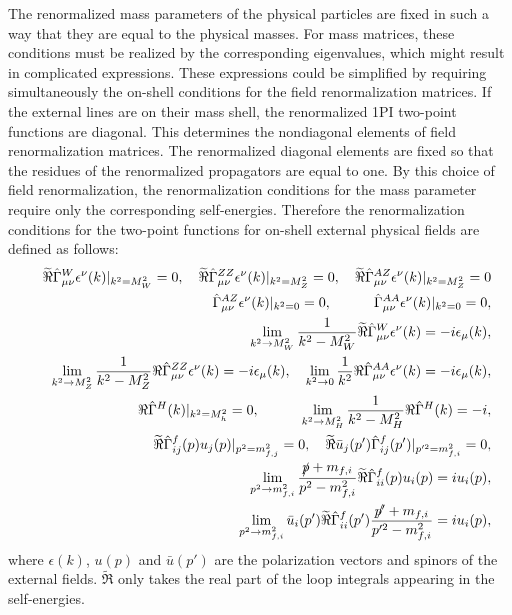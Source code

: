 The renormalized mass parameters of the physical particles are fixed in such a way that they are equal to the physical masses. For mass matrices, these conditions must be realized by the corresponding eigenvalues, which might result in complicated expressions. These expressions could be simplified by requiring simultaneously the on-shell conditions for the field renormalization matrices. If the external lines are on their mass shell, the renormalized 1PI two-point functions are diagonal. This determines the nondiagonal elements of field renormalization matrices. The renormalized diagonal elements are fixed so that the residues of the renormalized propagators are equal to one. By this choice of field renormalization, the renormalization conditions for the mass parameter require only the corresponding self-energies. Therefore the renormalization conditions for the two-point functions for on-shell external physical fields are defined as follows:
\begin{eqnarray}
&&\widetilde{\Re}\hat{\Gamma}^W_{\mu\nu}\epsilon^\nu(k)|_{k^2=M^2_W}=0,\quad \widetilde{\Re}\hat{\Gamma}^{ZZ}_{\mu\nu}\epsilon^\nu(k)|_{k^2=M^2_Z}=0,\quad \widetilde{\Re}\hat{\Gamma}^{AZ}_{\mu\nu}\epsilon^\nu(k)|_{k^2=M^2_Z}=0\nonumber\\
&&\hat{\Gamma}^{AZ}_{\mu\nu}\epsilon^\nu(k)|_{k^2=0}=0, \quad\qquad \hat{\Gamma}^{AA}_{\mu\nu}\epsilon^\nu(k)|_{k^2=0}=0,\nonumber\\
&&\lim_{k^2\to M_W^2}\frac{1}{k^2-M_W^2}\widetilde{\Re}\hat{\Gamma}^W_{\mu\nu}\epsilon^\nu(k)=-i\epsilon_\mu(k),\nonumber\\
&&\lim_{k^2\to M_Z^2}\frac{1}{k^2-M_Z^2}\Re\hat{\Gamma}^{ZZ}_{\mu\nu}\epsilon^\nu(k)=-i\epsilon_\mu(k), \quad \lim_{k^2\to 0}\frac{1}{k^2}\Re\hat{\Gamma}^{AA}_{\mu\nu}\epsilon^\nu(k)=-i\epsilon_\mu(k),\nonumber\\
&&\Re\hat{\Gamma}^H(k)|_{k^2=M_h^2}=0,\quad\qquad \lim_{k^2\to M_H^2}\frac{1}{k^2-M_H^2}\Re\hat{\Gamma}^H(k)=-i,\nonumber\\
&&\widetilde{\Re}\hat{\Gamma}^f_{ij}(p)u_j(p)|_{p^2=m^2_{f,j}}=0,\quad \widetilde{\Re}\bar{u}_j(p')\hat{\Gamma}^f_{ij}(p')|_{p'^2=m^2_{f,i}}=0,\nonumber\\
&&\lim_{p^2\to m^2_{f,i}}\frac{\slashed{p}+m_{f,i}}{p^2-m^2_{f,i}}\widetilde{\Re}\hat{\Gamma}^f_{ii}(p)u_i(p)=iu_i(p),\nonumber\\
&&\lim_{p^2\to m^2_{f,i}}\bar{u}_i(p')\widetilde{\Re}\hat{\Gamma}^f_{ii}(p')\frac{\slashed{p'}+m_{f,i}}{p'^2-m^2_{f,i}}=iu_i(p),
\end{eqnarray}
where $\epsilon(k)$, $u(p)$ and $\bar{u}(p')$ are the polarization vectors and spinors of the external fields. $\widetilde{\Re}$ only takes the real part of the loop integrals appearing in the self-energies. 

